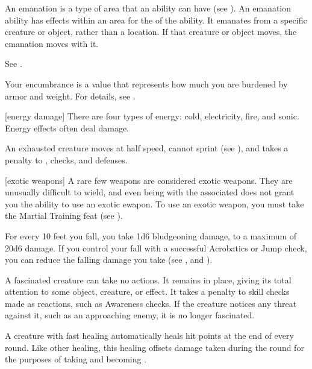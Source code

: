  An emanation is a type of area that an ability can have (see ).
An emanation ability has effects within an area for the  of the ability.
It emanates from a specific creature or object, rather than a location.
If that creature or object moves, the emanation moves with it.

 See .

 Your encumbrance is a value that represents how much you are burdened by armor and weight.
For details, see .

[energy damage] There are four types of energy: cold, electricity, fire, and sonic. Energy effects often deal damage.


 An exhausted creature moves at half speed, cannot sprint (see ), and takes a  penalty to , checks, and defenses.

[exotic weapons] A rare few weapons are considered exotic weapons.
They are unusually difficult to wield, and even being  with the associated  does not grant you the ability to use an exotic ewapon.
To use an exotic weapon, you must take the Martial Training feat (see ).

 For every 10 feet you fall, you take 1d6 bludgeoning damage, to a maximum of 20d6 damage.
If you control your fall with a successful Acrobatics or Jump check, you can reduce the falling damage you take (see , and ).

 A fascinated creature can take no actions. It remains in place, giving its total attention to some object, creature, or effect. It takes a  penalty to skill checks made as reactions, such as Awareness checks. If the creature notices any threat against it, such as an approaching enemy, it is no longer fascinated.

 A creature with fast healing automatically heals hit points at the end of every round.
Like other healing, this healing offsets damage taken during the round for the purposes of taking  and becoming \wounded.

